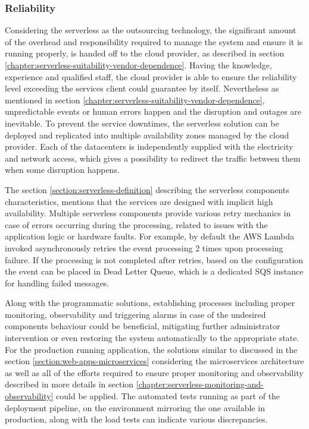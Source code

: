 
\subsubsection{Reliability} \label{chapter:serverless-suitability-reliability}

Considering the serverless as the outsourcing technology, the significant amount of the overhead and responsibility required to manage the system and ensure it is running properly, is handed off to the cloud provider, as described in section \ref{chapter:serverless-suitability-vendor-dependence}. Having the knowledge, experience and qualified staff, the cloud provider is able to ensure the reliability level exceeding the services client could guarantee by itself. Nevertheless as mentioned in section \ref{chapter:serverless-suitability-vendor-dependence}, unpredictable events or human errors happen and the disruption and outages are inevitable. To prevent the service downtimes, the serverless solution can be deployed and replicated into multiple availability zones managed by the cloud provider. Each of the datacenters is independently supplied with the electricity and network access, which gives a possibility to redirect the traffic between them when some disruption happens.

The section \ref{section:serverless-definition} describing the serverless components characteristics, mentions that the services are designed with implicit high availability. Multiple serverless components provide various retry mechanics in case of errors occurring during the processing, related to issues with the application logic or hardware faults. For example, by default the AWS Lambda invoked asynchronously retries the event processing 2 times upon processing failure. If the processing is not completed after retries, based on the configuration the event can be placed in Dead Letter Queue, which is a dedicated SQS instance for handling failed messages.

Along with the programmatic solutions, establishing processes including proper monitoring, observability and triggering alarms in case of the undesired components behaviour could be beneficial, mitigating further administrator intervention or even restoring the system automatically to the appropriate state.
For the production running application, the solutions similar to discussed in the section \ref{section:web-apps-microservices} considering the microservices architecture as well as all of the efforts required to ensure proper monitoring and observability described in more details in section \ref{chapter:serverless-monitoring-and-observability} could be applied.
The automated tests running as part of the deployment pipeline, on the environment mirroring the one available in production, along with the load tests can indicate various discrepancies.

